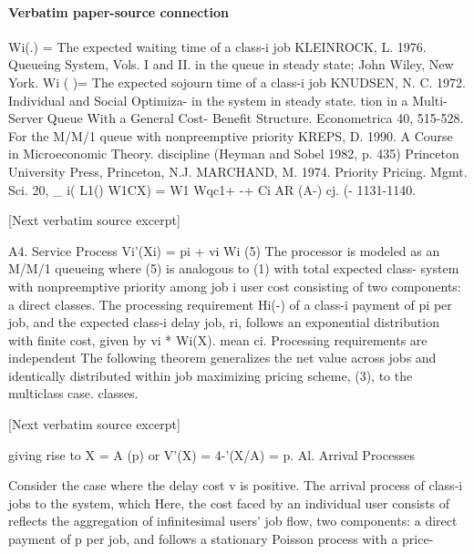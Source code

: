 \documentclass[10pt]{article}
\begin{document}
\paragraph{Verbatim paper-source connection}
\begin{ReviewVerbatim}
Wi(.) = The expected waiting time of a class-i job                      KLEINROCK, L. 1976. Queueing System, Vols. I and II.
         in the queue in steady state;                                       John Wiley, New York.
 Wi ( )= The expected sojourn time of a class-i job                     KNUDSEN, N. C. 1972. Individual and Social Optimiza-
         in the system in steady state.                                      tion in a Multi-Server Queue With a General Cost-
                                                                             Benefit Structure. Econometrica 40, 515-528.
For the M/M/1 queue with nonpreemptive priority                         KREPS, D. 1990. A Course in Microeconomic Theory.
discipline (Heyman and Sobel 1982, p. 435)                                 Princeton University Press, Princeton, N.J.
                                                                        MARCHAND, M. 1974. Priority Pricing. Mgmt. Sci. 20,
   _ i( L1()
 W1CX)  = W1 Wqc1+ -+
                   Ci AR   (A-)
                      cj. (-                                                  1131-1140.

[Next verbatim source excerpt]

A4. Service Process                                                      Vi'(Xi) = pi + vi Wi (5)
The processor is modeled as an M/M/1 queueing                          where (5) is analogous to (1) with total expected class-
system with nonpreemptive priority among job                           i user cost consisting of two components: a direct
classes. The processing requirement Hi(-) of a class-i                 payment of pi per job, and the expected class-i delay
job, ri, follows an exponential distribution with finite cost, given by vi * Wi(X).
mean ci. Processing requirements are independent           The following theorem generalizes the net value
across jobs and identically distributed within job       maximizing pricing scheme, (3), to the multiclass case.
classes.

[Next verbatim source excerpt]

giving rise to X = A (p) or V'(X) = 4-'(X/A) = p.                     Al. Arrival Processes

  Consider the case where the delay cost v is positive.               The arrival process of class-i jobs to the system, which
Here, the cost faced by an individual user consists of                reflects the aggregation of infinitesimal users' job flow,
two components: a direct payment of p per job, and                    follows a stationary Poisson process with a price-





\end{ReviewVerbatim}
\end{document}
